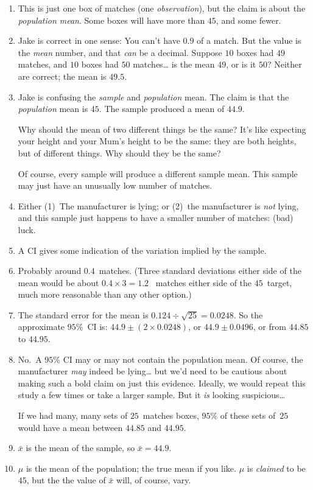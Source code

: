 \documentclass[
  11pt,
  a4paper,
  krantz2]{krantz}
\begin{document}
\begin{footnotesize}
\begin{enumerate}
\def\labelenumi{\arabic{enumi}.}
\item
  This is just one box of matches (one \emph{observation}), but the claim is about the \emph{population mean}.
  Some boxes will have more than \(45\), and some fewer.
\item
  Jake is correct in one sense: You can't have \(0.9\) of a match.
  But the value is the \emph{mean} number, and that \emph{can} be a decimal.
  Suppose \(10\) boxes had \(49\) matches, and \(10\) boxes had \(50\) matches\ldots{} is the mean \(49\), or is it \(50\)?
  Neither are correct; the mean is \(49.5\).
\item
  Jake is confusing the \emph{sample} and \emph{population} mean.
  The claim is that the \emph{population} mean is \(45\).
  The sample produced a mean of \(44.9\).

  Why should the mean of two different things be the same?
  It's like expecting your height and your Mum's height to be the same:
  they are both heights, but of different things.
  Why should they be the same?

  Of course, every sample will produce a different sample mean.
  This sample may just have an unusually low number of matches.
\item
  Either (1)~The manufacturer is lying; or (2)~the manufacturer is \emph{not} lying, and this sample just happens to have a smaller number of matches: (bad) luck.
\item
  A CI gives some indication of the variation implied by the sample.
\item
  Probably around \(0.4\)~matches.
  (Three standard deviations either side of the mean would be about \(0.4 \times 3 = 1.2\) ~matches either side of the \(45\)~target, much more reasonable than any other option.)
\item
  The standard error for the mean is \(0.124\div\sqrt{25} = 0.0248\).
  So the approximate \(95\)\%~CI is: \(44.9 \pm (2\times 0.0248)\), or \(44.9\pm 0.0496\), or from \(44.85\) to \(44.95\).
\item
  No.~A \(95\)\% CI may or may not contain the population mean.
  Of course, the manufacturer \emph{may} indeed be lying\ldots{}
  but we'd need to be cautious about making such a bold claim on just this evidence.
  Ideally, we would repeat this study a few times or take a larger sample.
  But it \emph{is} looking suspicious\ldots{}

  If we had many, many sets of \(25\)~matches boxes,
  \(95\)\% of these sets of~\(25\) would have a mean between \(44.85\) and \(44.95\).
\item
  \(\bar{x}\) is the mean of the sample, so \(\bar{x} = 44.9\).
\item
  \(\mu\) is the mean of the population; the true mean if you like.
  \(\mu\) is \emph{claimed} to be \(45\), but the the value of \(\bar{x}\) will, of course, vary.
\end{enumerate}


\end{footnotesize}
\end{document}
